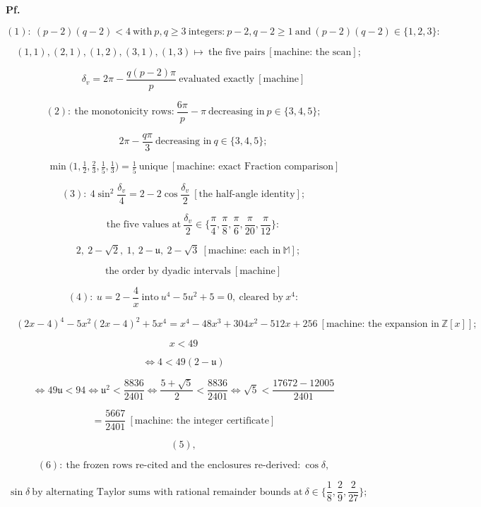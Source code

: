 \documentclass[11pt,openany]{report}
\theoremstyle{canonplain}
\theoremstyle{canondef}
\begin{document}
\textbf{Pf.}

\[
(1):\ (p-2)(q-2)<4\ \text{with}\ p,q\ge3\ \text{integers:}\ p-2,q-2\ge1\ \text{and}\ (p-2)(q-2)\in\{1,2,3\}:
\]

\[
\quad (1,1),(2,1),(1,2),(3,1),(1,3)\mapsto\ \text{the five pairs}\ [\text{machine: the scan}];
\]

\[
\qquad \delta_v=2\pi-\frac{q(p-2)\pi}p\ \text{evaluated exactly}\ [\text{machine}]
\]

\[
(2):\ \text{the monotonicity rows:}\ \frac{6\pi}p-\pi\ \text{decreasing in}\ p\in\{3,4,5\};
\]

\[
\qquad 2\pi-\frac{q\pi}3\ \text{decreasing in}\ q\in\{3,4,5\};
\]

\[
\qquad \min\bigl(1,\tfrac12,\tfrac23,\tfrac15,\tfrac13\bigr)=\tfrac15\ \text{unique}\ [\text{machine: exact Fraction comparison}]
\]

\[
(3):\ 4\sin^2\frac{\delta_v}4=2-2\cos\frac{\delta_v}2\ [\text{the half-angle identity}];
\]

\[
\qquad \text{the five values at}\ \frac{\delta_v}2\in\bigl\{\frac\pi4,\frac\pi8,\frac\pi6,\frac\pi{20},\frac\pi{12}\bigr\}:
\]

\[
\quad 2,\ 2-\sqrt2,\ 1,\ 2-\mathfrak u,\ 2-\sqrt3\ [\text{machine: each in}\ \mathbb M];
\]

\[
\qquad \text{the order by dyadic intervals}\ [\text{machine}]
\]

\[
(4):\ u=2-\frac4x\ \text{into}\ u^4-5u^2+5=0,\ \text{cleared by}\ x^4:
\]

\[
\quad (2x-4)^4-5x^2(2x-4)^2+5x^4=x^4-48x^3+304x^2-512x+256\ [\text{machine: the expansion in}\ \mathbb Z[x]];
\]

\[
x<49
\]

\[
\iff 4<49(2-\mathfrak u)
\]

\[
\iff 49\mathfrak u<94\iff\mathfrak u^2<\frac{8836}{2401}\iff\frac{5+\sqrt5}2<\frac{8836}{2401}\iff\sqrt5<\frac{17672-12005}{2401}
\]

\[
= \frac{5667}{2401}\ [\text{machine: the integer certificate}]
\]

\[
(5),
\]

\[
(6):\ \text{the frozen rows re-cited and the enclosures re-derived:}\ \cos\delta,
\]

\[
\ \sin\delta\ \text{by alternating Taylor sums with rational remainder bounds at}\ \delta\in\bigl\{\frac18,\frac29,\frac{2}{27}\bigr\};
\]
\end{document}
